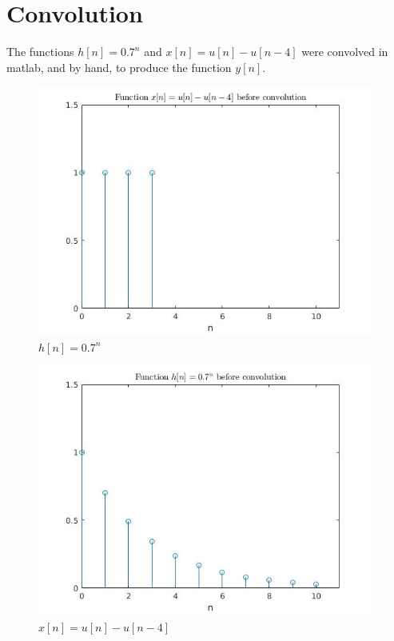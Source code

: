 \documentclass[a4paper,11pt]{article}
\begin{document}
\section*{Convolution}
The functions $h[n]=0.7^n$ and $x[n]=u[n]-u[n-4]$ were convolved in matlab, and by hand, to produce the function $y[n]$.\\
\begin{figure}[h]
\centering
\includegraphics[width=11cm]{x(n).jpg}
\caption{$h[n]=0.7^n$}
\end{figure}
\begin{figure}[h]
\centering
\includegraphics[width=11cm]{h(n).jpg}
\caption{$x[n]=u[n]-u[n-4]$}
\end{figure}
\newpage
\end{document}
